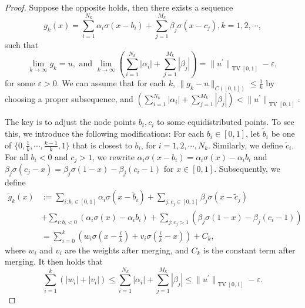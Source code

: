 \documentclass[10pt,a4paper]{amsart}
\newcommand{\lt}[1]{\texttt{\color{blue} TL: \footnotesize #1}}
\begin{document}
\begin{proof}





Suppose the opposite holds, then there exists a sequence
\begin{equation}
    g_k(x) = \sum_{i=1}^{N_k} \alpha_i\sigma(x-b_i)+\sum_{j=1}^{M_k} \beta_j\sigma(x-c_j), k=1,2, \cdots,
\end{equation}
such that
\begin{equation}
    \lim_{k\to \infty} g_k=u, \text{ and } \lim_{k\to \infty} \left(\sum_{i=1}^{N_k}|\alpha_i|+\sum_{j=1}^{M_k}|\beta_j|\right) = \|{u^\prime}\|_{\operatorname{TV}[0,1]}-\varepsilon,
\end{equation}
for some $\varepsilon >0$. We can assume that for each $k$, $\|g_k-u\|_{C([0,1])}\le \frac 1 k$ by choosing a proper subsequence, and $\left(\sum_{i=1}^{N_k}|\alpha_i|+\sum_{j=1}^{M_k}|\beta_j|\right) < \|{u^\prime}\|_{\operatorname{TV}[0,1]}.$

The key is to adjust the node points $b_i, c_i$ to some equidistributed points. To see this, we introduce the following modifications: For each $b_i\in [0,1]$, let $\tilde b_i$ be one of $\{0, \frac 1 k, \cdots, \frac{k-1}{k}, 1\}$ that is closest to $b_i$, for $i = 1,2,\cdots, N_k$.
Similarly, we define $\tilde c_i$.
For all $b_i<0$ and $c_j>1$, we rewrite $\alpha_i\sigma(x-b_i) = \alpha_i\sigma(x) - \alpha_i b_i$ and $\beta_j\sigma(c_j-x) = \beta_j\sigma(1-x) - \beta_j (c_i-1)$ for $x\in [0,1]$.
Subsequently, we define
\begin{equation}
    \begin{aligned}
            \tilde g_k(x) & := \sum_{i:b_i\in [0,1]} \alpha_i\sigma(x-\tilde b_i)+\sum_{j:c_j\in [0,1]} \beta_j\sigma(x-\tilde c_j)\\ &+\sum_{i:b_i<0} (\alpha_i\sigma(x) - \alpha_i b_i)  +\sum_{j:c_j>1} (\beta_j\sigma(1-x) - \beta_j (c_i-1))\\
            &= \sum_{i=0}^{k} \left(w_i \sigma(x-\frac{i}{k})+ v_i\sigma(\frac i k-x)\right) +C_k,
    \end{aligned}
\end{equation}
where $w_i$ and $v_i$ are the weights after merging, and $C_k$ is the constant term after merging.
It then holds that
\begin{equation}
    \label{eq:weight_sum_upper_bound}
    \sum_{i=1}^k (|w_i|+|v_i|)\le \sum_{i=1}^{N_k}|\alpha_i|+\sum_{j=1}^{M_k}|\beta_j| \le \|{u^\prime}\|_{\operatorname{TV}[0,1]}-\varepsilon.
\end{equation}



\end{proof}
\end{document}
